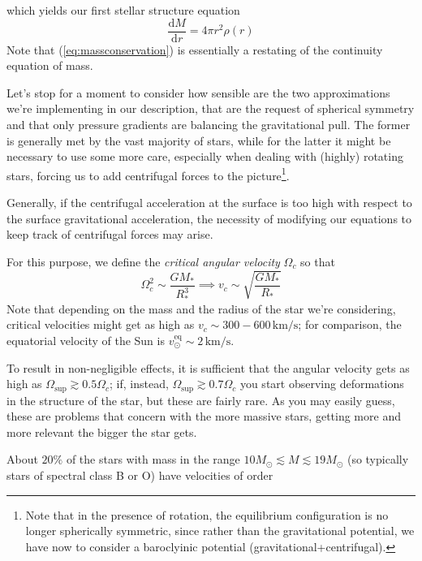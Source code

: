 which yields our first stellar structure equation
\begin{equation}
	\boxed{
		\frac{\text{d}M}{\text{d}r} = 4\pi r^{2}\rho(r)
	}
	\label{eq:massconservation}
\end{equation}
Note that (\ref{eq:massconservation}) is essentially a restating of the continuity equation of mass.
\par Let's stop for a moment to consider how sensible are the two approximations we're implementing in our description, that are the request of spherical symmetry and that only pressure gradients are balancing the gravitational pull. The former is generally met by the vast majority of stars, while for the latter it might be necessary to use some more care, especially when dealing with (highly) rotating stars, forcing us to add centrifugal forces to the picture\footnote{Note that in the presence of rotation, the equilibrium configuration is no longer spherically symmetric, since rather than the gravitational potential, we have now to consider a baroclyinic potential (gravitational+centrifugal).}.
\par Generally, if the centrifugal acceleration at the surface is too high with respect to the surface gravitational acceleration, the necessity of modifying our equations to keep track of centrifugal forces may arise.
\par For this purpose, we define the \emph{critical angular velocity} $\Omega_{c}$ so that
\begin{equation}
	\Omega_{c}^{2} \sim \frac{GM_{*}}{R_{*}^{3}} \implies v_{c} \sim \sqrt{\frac{GM_{*}}{R_{*}}}
	\label{eq:critical_av}
\end{equation}
Note that depending on the mass and the radius of the star we're considering, critical velocities might get as high as $v_{c} \sim 300-600\,\text{km}/\text{s}$; for comparison, the equatorial velocity of the Sun is $v_{\odot}^{\text{eq}} \sim 2\, \text{km}/\text{s}$.
\par To result in non-negligible effects, it is sufficient that the angular velocity gets as high as $\Omega_{\text{sup}} \gtrsim 0.5\Omega_{c}$; if, instead, $\Omega_{\text{sup}} \gtrsim 0.7\Omega_{c}$ you start observing deformations in the structure of the star, but these are fairly rare. As you may easily guess, these are problems that concern with the more massive stars, getting more and more relevant the bigger the star gets.
\par About $20\%$ of the stars with mass in the range $10M_{\odot}\lesssim M \lesssim 19M_{\odot}$ (so typically stars of spectral class B or O) have velocities of order
